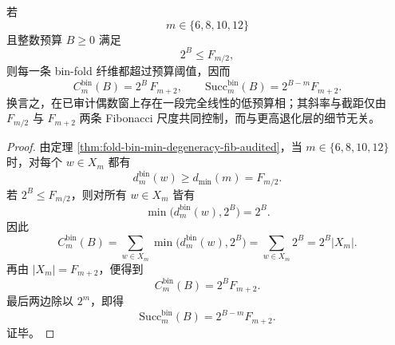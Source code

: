 \begin{theorem}\label{thm:xi-foldbin-audited-even-fibonacci-linear-low-budget-phase}
若
\[
m\in\{6,8,10,12\}
\]
且整数预算 \(B\ge 0\) 满足
\[
2^B\le F_{m/2},
\]
则每一条 bin-fold 纤维都超过预算阈值，因而
\[
\boxed{\;
C_m^{\mathrm{bin}}(B)=2^B\,F_{m+2},\qquad
\mathrm{Succ}_m^{\mathrm{bin}}(B)=2^{B-m}F_{m+2}.\;}
\]
换言之，在已审计偶数窗上存在一段完全线性的低预算相；其斜率与截距仅由
\(
F_{m/2}
\)
与
\(
F_{m+2}
\)
两条 Fibonacci 尺度共同控制，而与更高退化层的细节无关。
\end{theorem}
\begin{proof}
由定理 \ref{thm:fold-bin-min-degeneracy-fib-audited}，当 \(m\in\{6,8,10,12\}\) 时，对每个 \(w\in X_m\) 都有
\[
d_m^{\mathrm{bin}}(w)\ge d_{\min}(m)=F_{m/2}.
\]
若 \(2^B\le F_{m/2}\)，则对所有 \(w\in X_m\) 皆有
\[
\min\bigl(d_m^{\mathrm{bin}}(w),2^B\bigr)=2^B.
\]
因此
\[
C_m^{\mathrm{bin}}(B)
=
\sum_{w\in X_m}\min\bigl(d_m^{\mathrm{bin}}(w),2^B\bigr)
=
\sum_{w\in X_m}2^B
=
2^B|X_m|.
\]
再由 \(|X_m|=F_{m+2}\)，便得到
\[
C_m^{\mathrm{bin}}(B)=2^B F_{m+2}.
\]
最后两边除以 \(2^m\)，即得
\[
\mathrm{Succ}_m^{\mathrm{bin}}(B)=2^{B-m}F_{m+2}.
\]
证毕。
\end{proof}



\endinput
